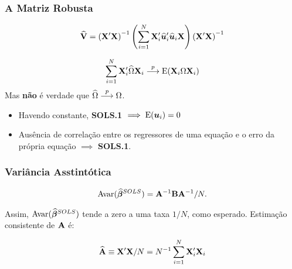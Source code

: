 \documentclass[11pt, oneside, a4paper, article]{article}
\numberwithin{equation}{section}
\begin{document}
\subsubsection{A Matriz Robusta}

\vspace{-2 em}
\begin{align*}
\widehat{\mathbf{V}} =
\left( \mathbf{X}' \mathbf{X} \right)^{-1}
\left( \sum_{i=1}^{N} \mathbf{X}_{i}' \widehat{\boldsymbol{u}}_{i}' \widehat{\boldsymbol{u}}_{i} \mathbf{X} \right)
\left( \mathbf{X}' \mathbf{X} \right)^{-1}
\end{align*}

\vspace{-1 em}
\begin{align*}
	\sum_{i=1}^{N} \mathbf{X}_{i}' \widehat{\Omega} \mathbf{X}_{i}  \overset{p}{\longrightarrow}  
	\text{E}(\mathbf{X}_{i} \Omega \mathbf{X}_{i})
\end{align*}
Mas \textbf{não} é verdade que $\widehat{\Omega}  \overset{p}{\longrightarrow}  \Omega$.

\begin{itemize}[noitemsep]
\item
Havendo constante, \textbf{SOLS.1} $\implies \text{E}(\boldsymbol{u}_{i})=0$
\item
Ausência de correlação entre os regressores de uma equação e o erro da própria equação $\implies$ \textbf{SOLS.1}.
\end{itemize}


\subsubsection{Variância Asstintótica}

\begin{center}
\end{center}

\vspace{-1 em}
\begin{align}\label{eq:avar:sols}
	\text{Avar}(\widehat{\boldsymbol{\beta}}^{SOLS}) = \mathbf{A}^{-1} \mathbf{B} \mathbf{A}^{-1}/N.
\end{align}

Assim, $\text{Avar}(\widehat{\boldsymbol{\beta}}^{SOLS})$ tende a zero a uma taxa $1/N$, como esperado.
Estimação consistente de $\mathbf{A}$ é:

\vspace{-1 em}
\begin{align*}
	\widehat{\mathbf{A}} \equiv \mathbf{X}'\mathbf{X}/N = N^{-1} \sum_{i=1}^{N} \mathbf{X}_{i}'\mathbf{X}_{i}
\end{align*}
\end{document}
